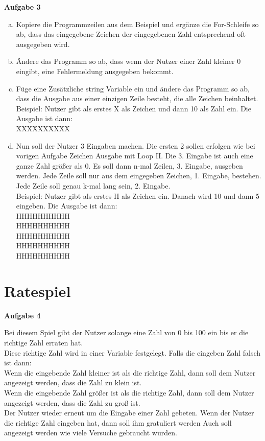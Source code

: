 \documentclass[a4paper,12pt]{article}
\newcommand{\Aufgabe}[1]{
  {
  \vspace*{0.5cm}
  \textsf{\textbf{Aufgabe #1}}
  \vspace*{0.2cm}
  
  }
}
\begin{document}
\Aufgabe{3} 
\begin{enumerate}[a)]
\item
Kopiere die Programmzeilen aus dem Beispiel und ergänze die For-Schleife so ab, dass das eingegebene Zeichen der eingegebenen Zahl entsprechend oft ausgegeben wird.
\item 
Ändere das Programm so ab, dass wenn der Nutzer einer Zahl kleiner 0 eingibt, eine Fehlermeldung ausgegeben bekommt.
\item
Füge eine Zusätzliche string Variable ein und ändere das Programm so ab, dass die Ausgabe aus einer einzigen Zeile besteht, die alle Zeichen beinhaltet. \\
Beispiel:  Nutzer gibt als erstes X als Zeichen und dann 10 als Zahl ein. Die Ausgabe ist dann:
\\
XXXXXXXXXX
\item
Nun soll der Nutzer 3 Eingaben machen. Die ersten 2 sollen erfolgen wie bei vorigen Aufgabe Zeichen Ausgabe mit Loop II. Die 3. Eingabe ist auch eine ganze Zahl größer als 0. Es soll dann n-mal Zeilen, 3. Eingabe, ausgeben werden. Jede Zeile soll nur aus dem eingegeben Zeichen, 1. Eingabe, bestehen. Jede Zeile soll genau k-mal lang sein, 2. Eingabe. \\

Beispiel: Nutzer gibt als erstes H als Zeichen ein. Danach wird 10 und dann 5 eingeben. Die Ausgabe ist dann: \\
HHHHHHHHHH \\
HHHHHHHHHH \\
HHHHHHHHHH \\
HHHHHHHHHH \\
HHHHHHHHHH \\

\end{enumerate}

\section{Ratespiel}
\Aufgabe{4} 
Bei diesem Spiel gibt der Nutzer solange eine Zahl von 0 bis 100 ein bis er die richtige Zahl erraten hat. \\

    Diese richtige Zahl wird in einer Variable festgelegt.
    Falls die eingeben Zahl falsch ist dann: \\
        Wenn die eingebende Zahl kleiner ist als die richtige Zahl, dann soll dem Nutzer angezeigt werden, dass die Zahl zu klein ist. \\
        Wenn die eingebende Zahl größer ist als die richtige Zahl, dann soll dem Nutzer angezeigt werden, dass die Zahl zu groß ist. \\
        Der Nutzer wieder erneut um die Eingabe einer Zahl gebeten.
    Wenn der Nutzer die richtige Zahl eingeben hat, dann soll ihm gratuliert werden Auch soll angezeigt werden wie viele Versuche gebraucht wurden.
\end{document}

